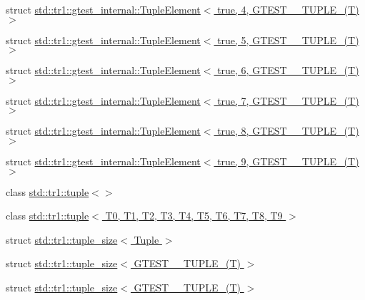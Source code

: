 \begin{DoxyCompactItemize}
\item 
struct \hyperlink{structstd_1_1tr1_1_1gtest__internal_1_1_tuple_element_3_01true_00_014_00_01_g_t_e_s_t__10___t_u_p_l_e___07_t_08_01_4}{std\-::tr1\-::gtest\-\_\-internal\-::\-Tuple\-Element$<$ true, 4, G\-T\-E\-S\-T\-\_\-\_\-\-T\-U\-P\-L\-E\-\_\-(\-T) $>$}
\item 
struct \hyperlink{structstd_1_1tr1_1_1gtest__internal_1_1_tuple_element_3_01true_00_015_00_01_g_t_e_s_t__10___t_u_p_l_e___07_t_08_01_4}{std\-::tr1\-::gtest\-\_\-internal\-::\-Tuple\-Element$<$ true, 5, G\-T\-E\-S\-T\-\_\-\_\-\-T\-U\-P\-L\-E\-\_\-(\-T) $>$}
\item 
struct \hyperlink{structstd_1_1tr1_1_1gtest__internal_1_1_tuple_element_3_01true_00_016_00_01_g_t_e_s_t__10___t_u_p_l_e___07_t_08_01_4}{std\-::tr1\-::gtest\-\_\-internal\-::\-Tuple\-Element$<$ true, 6, G\-T\-E\-S\-T\-\_\-\_\-\-T\-U\-P\-L\-E\-\_\-(\-T) $>$}
\item 
struct \hyperlink{structstd_1_1tr1_1_1gtest__internal_1_1_tuple_element_3_01true_00_017_00_01_g_t_e_s_t__10___t_u_p_l_e___07_t_08_01_4}{std\-::tr1\-::gtest\-\_\-internal\-::\-Tuple\-Element$<$ true, 7, G\-T\-E\-S\-T\-\_\-\_\-\-T\-U\-P\-L\-E\-\_\-(\-T) $>$}
\item 
struct \hyperlink{structstd_1_1tr1_1_1gtest__internal_1_1_tuple_element_3_01true_00_018_00_01_g_t_e_s_t__10___t_u_p_l_e___07_t_08_01_4}{std\-::tr1\-::gtest\-\_\-internal\-::\-Tuple\-Element$<$ true, 8, G\-T\-E\-S\-T\-\_\-\_\-\-T\-U\-P\-L\-E\-\_\-(\-T) $>$}
\item 
struct \hyperlink{structstd_1_1tr1_1_1gtest__internal_1_1_tuple_element_3_01true_00_019_00_01_g_t_e_s_t__10___t_u_p_l_e___07_t_08_01_4}{std\-::tr1\-::gtest\-\_\-internal\-::\-Tuple\-Element$<$ true, 9, G\-T\-E\-S\-T\-\_\-\_\-\-T\-U\-P\-L\-E\-\_\-(\-T) $>$}
\item 
class \hyperlink{classstd_1_1tr1_1_1tuple_3_4}{std\-::tr1\-::tuple$<$$>$}
\item 
class \hyperlink{classstd_1_1tr1_1_1tuple}{std\-::tr1\-::tuple$<$ T0, T1, T2, T3, T4, T5, T6, T7, T8, T9 $>$}
\item 
struct \hyperlink{structstd_1_1tr1_1_1tuple__size}{std\-::tr1\-::tuple\-\_\-size$<$ Tuple $>$}
\item 
struct \hyperlink{structstd_1_1tr1_1_1tuple__size_3_01_g_t_e_s_t__0___t_u_p_l_e___07_t_08_01_4}{std\-::tr1\-::tuple\-\_\-size$<$ G\-T\-E\-S\-T\-\_\-\_\-\-T\-U\-P\-L\-E\-\_\-(\-T) $>$}
\item 
struct \hyperlink{structstd_1_1tr1_1_1tuple__size_3_01_g_t_e_s_t__1___t_u_p_l_e___07_t_08_01_4}{std\-::tr1\-::tuple\-\_\-size$<$ G\-T\-E\-S\-T\-\_\-\_\-\-T\-U\-P\-L\-E\-\_\-(\-T) $>$}

\end{DoxyCompactItemize}

